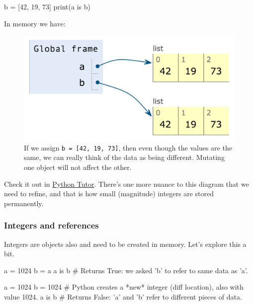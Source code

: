 \documentclass[12pt,letterpaper,twoside]{article}
\begin{document}
\begin{enumerate}
\begin{python}
b = [42, 19, 73]
print(a is b)
\end{python}

In memory we have:

\begin{figure}[h]
\centering
\includegraphics[scale=0.35]{fig/list-2.png}
\caption{If we assign \texttt{b = [42, 19, 73]}, then even though the values are the same, we can really think of the data as being different. Mutating one object will not affect the other.}
\end{figure}

Check it out in
\href{http://www.pythontutor.com/visualize.html\#code=a\%20\%3D\%20\%5B42,\%2019,\%2073\%5D\%0Ab\%20\%3D\%20a\%0Aprint(a\%20is\%20b\%29\%0Ab\%20\%3D\%20\%5B42,\%2019,\%2073\%5D\%0Aprint(a\%20is\%20b\%29\%0A\&cumulative=false\&curInstr=0\&heapPrimitives=false\&mode=display\&origin=opt-frontend.js\&py=3\&rawInputLstJSON=\%5B\%5D\&textReferences=false}{Python Tutor}.
There's one more nuance to this diagram that we need to refine, and that is how small (magnitude) integers are stored permanently.

\subsubsection{Integers and references}
Integers are objects also and need to be created in memory. Let's
explore this a bit.

\begin{python}
a = 1024
b = a
a is b     # Returns True: we asked 'b' to refer to same data as 'a'.
\end{python}

\begin{python}
a = 1024   
b = 1024   # Python creates a *new* integer (diff location), also with value 1024.
a is b     # Returns False: 'a' and 'b' refer to different pieces of data.


\end{python}
\end{enumerate}
\end{document}
